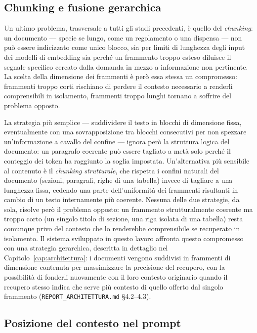 \subsection{Chunking e fusione gerarchica}

Un ultimo problema, trasversale a tutti gli stadi precedenti, è quello del \emph{chunking}: un documento --- specie se
lungo, come un regolamento o una dispensa --- non può essere indicizzato come unico blocco, sia per limiti di
lunghezza degli input dei modelli di embedding sia perché un frammento troppo esteso diluisce il segnale specifico
cercato dalla domanda in mezzo a informazione non pertinente. La scelta della dimensione dei frammenti è però essa
stessa un compromesso: frammenti troppo corti rischiano di perdere il contesto necessario a renderli comprensibili
in isolamento, frammenti troppo lunghi tornano a soffrire del problema opposto.

La strategia più semplice --- suddividere il testo in blocchi di dimensione fissa, eventualmente con una
sovrapposizione tra blocchi consecutivi per non spezzare un'informazione a cavallo del confine --- ignora però la
struttura logica del documento: un paragrafo coerente può essere tagliato a metà solo perché il conteggio dei token
ha raggiunto la soglia impostata. Un'alternativa più sensibile al contenuto è il \emph{chunking strutturale}, che
rispetta i confini naturali del documento (sezioni, paragrafi, righe di una tabella) invece di tagliare a una
lunghezza fissa, cedendo una parte dell'uniformità dei frammenti risultanti in cambio di un testo internamente più
coerente. Nessuna delle due strategie, da sola, risolve però il problema opposto: un frammento strutturalmente
coerente ma troppo corto (un singolo titolo di sezione, una riga isolata di una tabella) resta comunque privo del
contesto che lo renderebbe comprensibile se recuperato in isolamento. Il sistema sviluppato in questo
lavoro affronta questo compromesso con una strategia gerarchica, descritta in dettaglio nel
Capitolo~\ref{cap:architettura}: i documenti vengono suddivisi in frammenti di dimensione contenuta per massimizzare
la precisione del recupero, con la possibilità di fonderli nuovamente con il loro contesto originario quando il
recupero stesso indica che serve più contesto di quello offerto dal singolo frammento (\texttt{REPORT\_ARCHITETTURA.md}
\S4.2--4.3).

\subsection{Posizione del contesto nel prompt}

